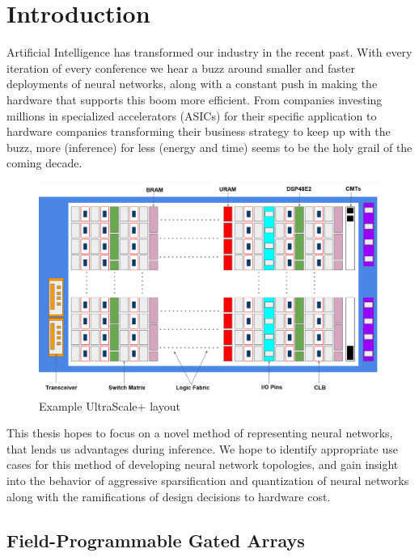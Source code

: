 \chapter{Introduction}

Artificial Intelligence has transformed our industry in the recent past. With every iteration of every conference we hear a buzz around smaller and faster deployments of neural networks, along with a constant push in making the hardware that supports this boom more efficient. From companies investing millions in specialized accelerators (ASICs) for their specific application to hardware companies transforming their business strategy to keep up with the buzz, more (inference) for less (energy and time) seems to be the holy grail of the coming decade. 

\begin{figure}
    \centering
    \includegraphics[width=400pt]{figures/bison/FPGA.png}
    \caption{Example UltraScale+ layout}
    \label{fig:fpga}
\end{figure}


This thesis hopes to focus on a novel method of representing neural networks, that lends us advantages during inference. We hope to identify appropriate use cases for this method of developing neural network topologies, and gain insight into the behavior of  aggressive sparsification and quantization of neural networks along with the ramifications of design decisions to hardware cost.


\section{Field-Programmable Gated Arrays}

